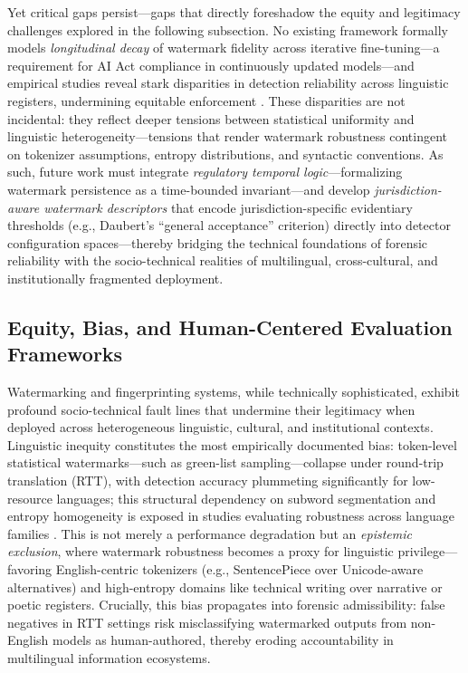 \documentclass[11pt,a4paper]{article}
\begin{document}
Yet critical gaps persist---gaps that directly foreshadow the equity and legitimacy challenges explored in the following subsection. No existing framework formally models \emph{longitudinal decay} of watermark fidelity across iterative fine-tuning---a requirement for AI Act compliance in continuously updated models---and empirical studies reveal stark disparities in detection reliability across linguistic registers, undermining equitable enforcement \cite{arxiv:2506.01011}. These disparities are not incidental: they reflect deeper tensions between statistical uniformity and linguistic heterogeneity---tensions that render watermark robustness contingent on tokenizer assumptions, entropy distributions, and syntactic conventions. As such, future work must integrate \emph{regulatory temporal logic}---formalizing watermark persistence as a time-bounded invariant---and develop \emph{jurisdiction-aware watermark descriptors} that encode jurisdiction-specific evidentiary thresholds (e.g., Daubert's ``general acceptance'' criterion) directly into detector configuration spaces---thereby bridging the technical foundations of forensic reliability with the socio-technical realities of multilingual, cross-cultural, and institutionally fragmented deployment.


\subsection{Equity, Bias, and Human-Centered Evaluation Frameworks}


Watermarking and fingerprinting systems, while technically sophisticated, exhibit profound socio-technical fault lines that undermine their legitimacy when deployed across heterogeneous linguistic, cultural, and institutional contexts. Linguistic inequity constitutes the most empirically documented bias: token-level statistical watermarks---such as green-list sampling---collapse under round-trip translation (RTT), with detection accuracy plummeting significantly for low-resource languages; this structural dependency on subword segmentation and entropy homogeneity is exposed in studies evaluating robustness across language families \cite{arxiv:2301.10226,arxiv:2305.08883,arxiv:2306.04634}. This is not merely a performance degradation but an \emph{epistemic exclusion}, where watermark robustness becomes a proxy for linguistic privilege---favoring English-centric tokenizers (e.g., SentencePiece over Unicode-aware alternatives) and high-entropy domains like technical writing over narrative or poetic registers. Crucially, this bias propagates into forensic admissibility: false negatives in RTT settings risk misclassifying watermarked outputs from non-English models as human-authored, thereby eroding accountability in multilingual information ecosystems.
\end{document}
